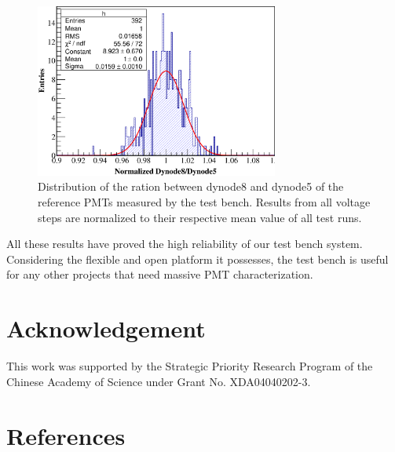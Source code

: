 \documentclass[5p, times]{elsarticle}
\begin{document}
\begin{figure}
 \centering
 \includegraphics[width=80mm]{RefDy58Dist}
\caption{Distribution of the ration between dynode8 and dynode5 of the reference PMTs measured by the test bench.
Results from all voltage steps are normalized to their respective mean value of all test runs.}
\label{fig:dy58_stabiltiy}
\end{figure} 

All these results have proved the high reliability of our test bench system.
Considering the flexible and open platform it possesses, the test bench is useful for any other projects that need massive PMT characterization. 

\section*{Acknowledgement}

This work was supported by the Strategic Priority Research Program of the Chinese Academy of Science under Grant No. XDA04040202-3.


\section*{References}

\end{document}
